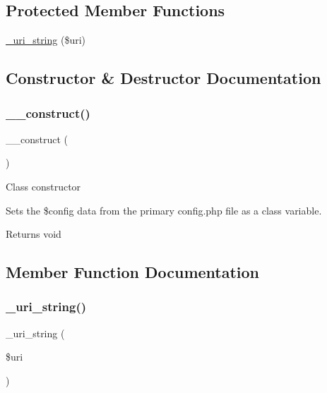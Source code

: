 \subsection*{Protected Member Functions}
\begin{DoxyCompactItemize}
\item 
\mbox{\hyperlink{class_c_i___config_a8a0a35d53f0904d9f655e82804b9998d}{\+\_\+uri\+\_\+string}} (\$uri)
\end{DoxyCompactItemize}


\subsection{Constructor \& Destructor Documentation}
\mbox{\label{class_c_i___config_a095c5d389db211932136b53f25f39685}} 
\subsubsection{\texorpdfstring{\+\_\+\+\_\+construct()}{\_\_construct()}}
{\footnotesize\ttfamily \+\_\+\+\_\+construct (\begin{DoxyParamCaption}{ }\end{DoxyParamCaption})}

Class constructor

Sets the \$config data from the primary config.\+php file as a class variable.

\begin{DoxyReturn}{Returns}
void 
\end{DoxyReturn}


\subsection{Member Function Documentation}
\mbox{\label{class_c_i___config_a8a0a35d53f0904d9f655e82804b9998d}} 
\subsubsection{\texorpdfstring{\+\_\+uri\+\_\+string()}{\_uri\_string()}}
{\footnotesize\ttfamily \+\_\+uri\+\_\+string (\begin{DoxyParamCaption}\item[{}]{\$uri }\end{DoxyParamCaption})\hspace{0.3cm}{\ttfamily [protected]}}

